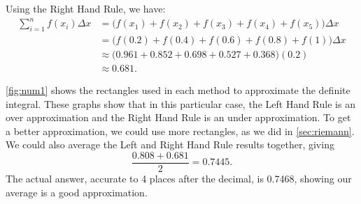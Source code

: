 {Using the Right Hand Rule, we have:
\begin{align*}
	\sum_{i=1}^n f(x_i)\Delta x
	&= \big(f(x_1)+f(x_2) + f(x_3) + f(x_4) + f(x_5)\big)\Delta x \\
	&= \big(f(0.2) + f(0.4) + f(0.6) + f(0.8)+f(1)\big)\Delta x \\
	&\approx \big(0.961 +0.852 + 0.698 + 0.527 + 0.368)(0.2)\\
	&\approx 0.681.
\end{align*}

\autoref{fig:num1} shows the rectangles used in each method to approximate the definite integral. These graphs show that in this particular case, the Left Hand Rule is an over approximation and the Right Hand Rule is an under approximation. To get a better approximation, we could use more rectangles, as we did in \autoref{sec:riemann}. We could also average the Left and Right Hand Rule results together, giving
\[\frac{0.808 + 0.681}{2} = 0.7445.\]
The actual answer, accurate to 4 places after the decimal, is 0.7468, showing our average is a good approximation.}


